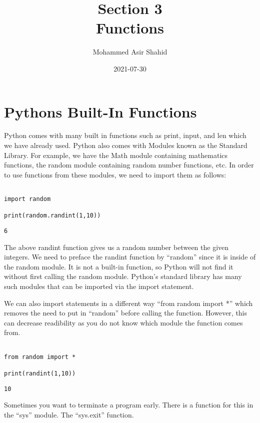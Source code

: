 \documentclass[11pt]{article}
\author{Mohammed Asir Shahid}
\date{2021-07-30}
\title{Section 3\\\medskip
\large Functions}
\begin{document}
\maketitle
\tableofcontents


\section{Pythons Built-In Functions}
\label{sec:org403f03b}

Python comes with many built in functions such as print, input, and len which we have already used. Python also comes with Modules known as the Standard Library. For example, we have the Math module containing mathematics functions, the random module containing random number functions, etc. In order to use functions from these modules, we need to import them as follows:

\begin{verbatim}

import random

print(random.randint(1,10))

\end{verbatim}

\begin{verbatim}
6
\end{verbatim}


The above randint function gives us a random number between the given integers. We need to preface the randint function by ``random'' since it is inside of the random module. It is not a built-in function, so Python will not find it without first calling the random module. Python's standard library has many such modules that can be imported via the import statement.

We can also import statements in a different way ``from random import *'' which removes the need to put in ``random'' before calling the function. However, this can decrease readibility as you do not know which module the function comes from.

\begin{verbatim}

from random import *

print(randint(1,10))

\end{verbatim}

\begin{verbatim}
10
\end{verbatim}


Sometimes you want to terminate a program early. There is a function for this in the ``sys'' module. The ``sys.exit'' function.
\end{document}

